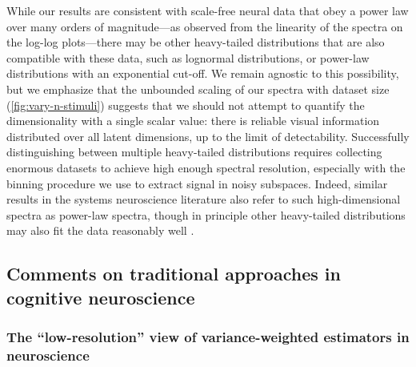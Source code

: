 \documentclass[10pt]{article}
\begin{document}
While our results are consistent with scale-free neural data that obey a power law over many orders of magnitude---as observed from the linearity of the spectra on the log-log plots---there may be other heavy-tailed distributions that are also compatible with these data, such as lognormal distributions, or power-law distributions with an exponential cut-off. We remain agnostic to this possibility, but we emphasize that the unbounded scaling of our spectra with dataset size (\ref{fig:vary-n-stimuli}) suggests that we should not attempt to quantify the dimensionality with a single scalar value: there is reliable visual information distributed over all latent dimensions, up to the limit of detectability. Successfully distinguishing between multiple heavy-tailed distributions requires collecting enormous datasets to achieve high enough spectral resolution, especially with the binning procedure we use to extract signal in noisy subspaces. Indeed, similar results in the systems neuroscience literature also refer to such high-dimensional spectra as power-law spectra, though in principle other heavy-tailed distributions may also fit the data reasonably well \autocite{Stringer2019,Manley2024}.

\subsection{Comments on traditional approaches in cognitive neuroscience}\label{comments-on-traditional-approaches-in-cognitive-neuroscience}

\subsubsection{The ``low-resolution'' view of variance-weighted estimators in neuroscience}\label{the-low-resolution-view-of-variance-weighted-estimators-in-neuroscience}
\end{document}
